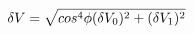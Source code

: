 \begin{equation}
\label{eq:delta_V_Malus}
\delta V = \sqrt{ \\cos^4{\phi}(\delta V_0)^2 + (\delta V_1)^2}
\end{equation}